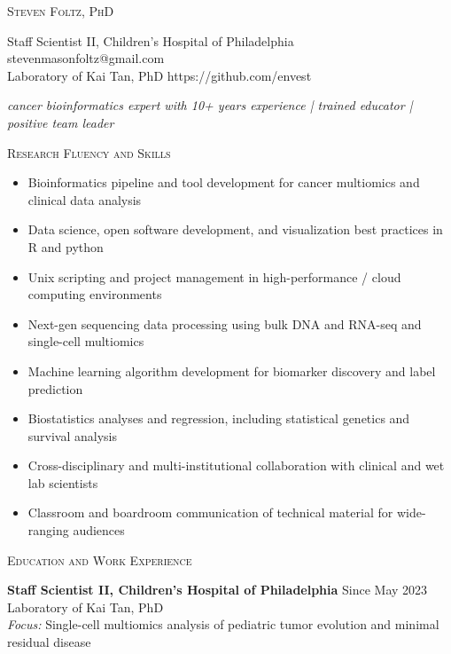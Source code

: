 \documentclass[11pt]{article}
\begin{document}
\textsc{{\huge Steven Foltz, PhD}}

\bigskip

Staff Scientist II, Children's Hospital of Philadelphia \hfill stevenmasonfoltz@gmail.com \\
Laboratory of Kai Tan, PhD \hfill https://github.com/envest

\begin{center}
\emph{cancer bioinformatics expert with 10+ years experience | trained educator | positive team leader}
\end{center}

\hrulefill

\bigskip

\textsc{{\Large Research Fluency and Skills}}
\begin{itemize}
\item Bioinformatics pipeline and tool development for cancer multiomics and clinical data analysis
\item Data science, open software development, and visualization best practices in R and python
\item Unix scripting and project management in high-performance / cloud computing environments
\item Next-gen sequencing data processing using bulk DNA and RNA-seq and single-cell multiomics
\item Machine learning algorithm development for biomarker discovery and label prediction
\item Biostatistics analyses and regression, including statistical genetics and survival analysis
\item Cross-disciplinary and multi-institutional collaboration with clinical and wet lab scientists
\item Classroom and boardroom communication of technical material for wide-ranging audiences

\end{itemize}

\hrulefill

\bigskip

\textsc{{\Large Education and Work Experience}}

\bigskip

\textbf{Staff Scientist II, Children's Hospital of Philadelphia} \hfill Since May 2023 \\
Laboratory of Kai Tan, PhD \\
\emph{Focus:} Single-cell multiomics analysis of pediatric tumor evolution and minimal residual disease \\
\end{document}
